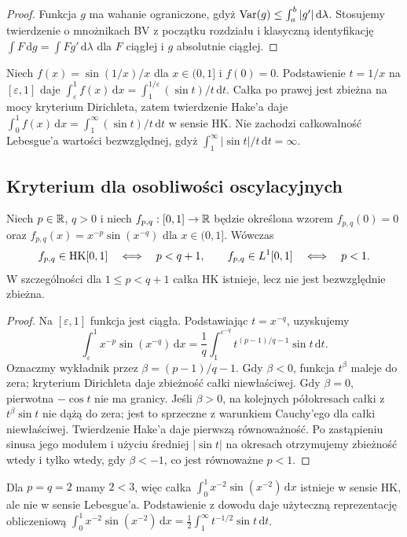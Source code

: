 \begin{proof}
Funkcja $g$ ma wahanie ograniczone, gdyż $\operatorname{Var}(g)\le\int_a^b|g'|\,\mathrm d\lambda$. Stosujemy twierdzenie o mnożnikach BV z początku rozdziału i klasyczną identyfikację $\int F\,\mathrm dg=\int Fg'\,\mathrm d\lambda$ dla $F$ ciągłej i $g$ absolutnie ciągłej.
\end{proof}
\begin{przyklad}
Niech $f(x)=\sin(1/x)/x$ dla $x\in(0,1]$ i $f(0)=0$. Podstawienie $t=1/x$ na $[\varepsilon,1]$ daje
$\int_\varepsilon^1f(x)\,\mathrm dx=\int_1^{1/\varepsilon}(\sin t)/t\,\mathrm dt$.
Całka po prawej jest zbieżna na mocy kryterium Dirichleta, zatem twierdzenie Hake'a daje
$\int_0^1f(x)\,\mathrm dx=\int_1^\infty (\sin t)/t\,\mathrm dt$ w sensie HK. Nie zachodzi całkowalność Lebesgue'a wartości bezwzględnej, gdyż $\int_1^\infty|\sin t|/t\,\mathrm dt=\infty$.
\end{przyklad}

\subsection*{Kryterium dla osobliwości oscylacyjnych}
\begin{twierdzenie}\label{tw:hk-oscylacyjne}
Niech $p\in\mathbb R$, $q>0$ i niech $f_{p,q}:[0,1]\to\mathbb R$ będzie określona wzorem $f_{p,q}(0)=0$ oraz $f_{p,q}(x)=x^{-p}\sin(x^{-q})$ dla $x\in(0,1]$. Wówczas
\[
 f_{p,q}\in\mathrm{HK}[0,1]\quad\Longleftrightarrow\quad p<q+1,
 \qquad f_{p,q}\in L^1[0,1]\quad\Longleftrightarrow\quad p<1.
\]
W szczególności dla $1\le p<q+1$ całka HK istnieje, lecz nie jest bezwzględnie zbieżna.
\end{twierdzenie}
\begin{proof}
Na $[\varepsilon,1]$ funkcja jest ciągła. Podstawiając $t=x^{-q}$, uzyskujemy
\[
\int_\varepsilon^1x^{-p}\sin(x^{-q})\,\mathrm dx
=\frac1q\int_1^{\varepsilon^{-q}}t^{(p-1)/q-1}\sin t\,\mathrm dt.
\]
Oznaczmy wykładnik przez $\beta=(p-1)/q-1$. Gdy $\beta<0$, funkcja $t^\beta$ maleje do zera; kryterium Dirichleta daje zbieżność całki niewłaściwej. Gdy $\beta=0$, pierwotna $-\cos t$ nie ma granicy. Jeśli $\beta>0$, na kolejnych półokresach całki z $t^\beta\sin t$ nie dążą do zera; jest to sprzeczne z warunkiem Cauchy'ego dla całki niewłaściwej. Twierdzenie Hake'a daje pierwszą równoważność. Po zastąpieniu sinusa jego modułem i użyciu średniej $|\sin t|$ na okresach otrzymujemy zbieżność wtedy i tylko wtedy, gdy $\beta<-1$, co jest równoważne $p<1$.
\end{proof}
\begin{przyklad}
Dla $p=q=2$ mamy $2<3$, więc całka $\int_0^1x^{-2}\sin(x^{-2})\,\mathrm dx$ istnieje w sensie HK, ale nie w sensie Lebesgue'a. Podstawienie z dowodu daje użyteczną reprezentację obliczeniową
$\int_0^1x^{-2}\sin(x^{-2})\,\mathrm dx=\tfrac12\int_1^\infty t^{-1/2}\sin t\,\mathrm dt$.
\end{przyklad}

